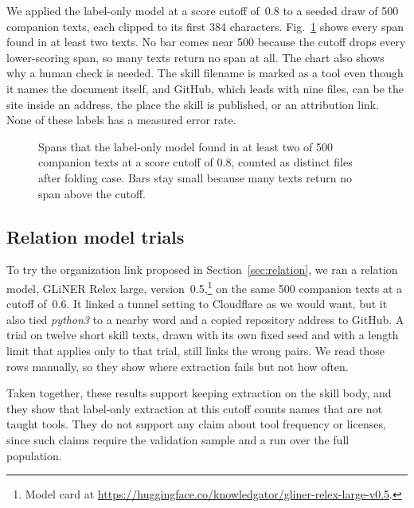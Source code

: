 We applied the label-only model at a score cutoff of~$0.8$ to a seeded draw of 500 companion texts, each clipped to its first 384 characters.
Fig.~\ref{fig:label-only-top} shows every span found in at least two texts.
No bar comes near 500 because the cutoff drops every lower-scoring span, so many texts return no span at all.
The chart also shows why a human check is needed.
The skill filename is marked as a tool even though it names the document itself, and GitHub, which leads with nine files, can be the site inside an address, the place the skill is published, or an attribution link.
None of these labels has a measured error rate.

\begin{figure}[!t]
  \centering
  
  \caption{Spans that the label-only model found in at least two of 500 companion texts at a score cutoff of 0.8, counted as distinct files after folding case.
    Bars stay small because many texts return no span above the cutoff.}
  \label{fig:label-only-top}
\end{figure}

\subsection{Relation model trials}

To try the organization link proposed in Section~\ref{sec:relation}, we ran a relation model, GLiNER Relex large, version~0.5,\footnote{Model card at \url{https://huggingface.co/knowledgator/gliner-relex-large-v0.5}.} on the same 500 companion texts at a cutoff of~$0.6$.
It linked a tunnel setting to Cloudflare as we would want, but it also tied \textit{python3} to a nearby word and a copied repository address to GitHub.
A trial on twelve short skill texts, drawn with its own fixed seed and with a length limit that applies only to that trial, still links the wrong pairs.
We read those rows manually, so they show where extraction fails but not how often.

Taken together, these results support keeping extraction on the skill body, and they show that label-only extraction at this cutoff counts names that are not taught tools.
They do not support any claim about tool frequency or licenses, since such claims require the validation sample and a run over the full population.
